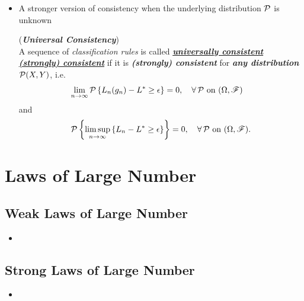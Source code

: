 \documentclass[11pt]{article}
\begin{document}
\begin{itemize}
\item A stronger version of consistency when the underlying distribution ${\mathcal P}$ is unknown
\begin{definition} (\emph{\textbf{Universal Consistency}})\\
A sequence of \emph{classification rules} is called \underline{\emph{\textbf{universally consistent (strongly) consistent}}} if it is \emph{\textbf{(strongly) consistent}} for \emph{\textbf{any distribution}} ${\mathcal P}(X,Y)$, i.e. 
\begin{align*}
\lim\limits_{n\rightarrow \infty}{\mathcal P}\left\{ L_{n}(g_{n}) - L^{*}\ge \epsilon \right\}&= 0, \quad \forall\, {\mathcal P} \text{ on }(\Omega, {\mathscr F})
\end{align*}
and 
\begin{align*}
{\mathcal P}\left\{ \limsup\limits_{n\rightarrow \infty}\left\{L_{n} - L^{*}\ge \epsilon \right\}\right\} = 0, \quad \forall\, {\mathcal P} \text{ on }(\Omega, {\mathscr F}).
\end{align*}
\end{definition}
\end{itemize}

\section{Laws of Large Number}
\subsection{Weak Laws of Large Number}
\begin{itemize}
\item 
\end{itemize}
\subsection{Strong Laws of Large Number}
\begin{itemize}
\item 
\end{itemize}
\end{document}
